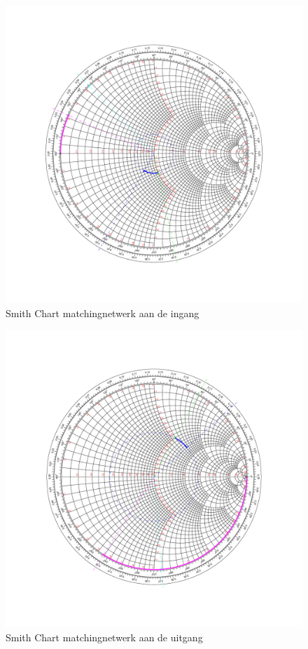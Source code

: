   \begin{figure}
    \centering
    \includegraphics[width=\textwidth,keepaspectratio=true]{fig/matchSource.pdf}
    \caption{Smith Chart matchingnetwerk aan de ingang}
    \label{fig:matchIn}
  \end{figure}

  \begin{figure}
    \centering
    \includegraphics[width=\textwidth,keepaspectratio=true]{fig/matchLoad.pdf}
    \caption{Smith Chart matchingnetwerk aan de uitgang}
    \label{fig:matchOut}
  \end{figure}
  


